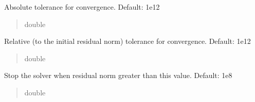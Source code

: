\documentclass[letterpaper,10pt,english]{sphinxmanual}
\begin{document}
\begin{fulllineitems}

\begin{fulllineitems}
\label{\detokenize{_autosummary/nirfasterff.utils.SolverOptions:nirfasterff.utils.SolverOptions.AbsoluteTolerance}}
\pysigstartsignatures
{}
\pysigstopsignatures
\sphinxAtStartPar
Absolute tolerance for convergence. Default: 1e\sphinxhyphen{}12
\begin{quote}\begin{description}
\sphinxAtStartPar
double

\end{description}\end{quote}

\end{fulllineitems}


\begin{fulllineitems}
\label{\detokenize{_autosummary/nirfasterff.utils.SolverOptions:nirfasterff.utils.SolverOptions.RelativeTolerance}}
\pysigstartsignatures
{}
\pysigstopsignatures
\sphinxAtStartPar
Relative (to the initial residual norm) tolerance for convergence. Default: 1e\sphinxhyphen{}12
\begin{quote}\begin{description}
\sphinxAtStartPar
double

\end{description}\end{quote}

\end{fulllineitems}


\begin{fulllineitems}
\label{\detokenize{_autosummary/nirfasterff.utils.SolverOptions:nirfasterff.utils.SolverOptions.divergence}}
\pysigstartsignatures
{}
\pysigstopsignatures
\sphinxAtStartPar
Stop the solver when residual norm greater than this value. Default: 1e8
\begin{quote}\begin{description}
\sphinxAtStartPar
double


\end{description}
\end{quote}
\end{fulllineitems}
\end{fulllineitems}
\end{document}
